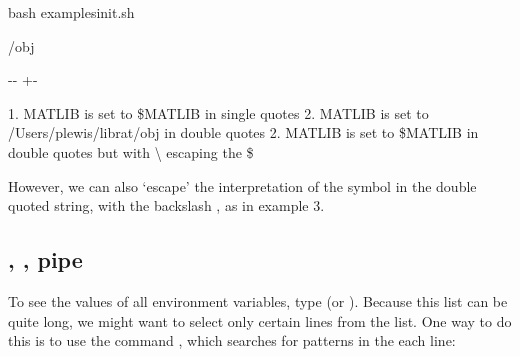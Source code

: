 \documentclass[letterpaper,10pt,english]{sphinxmanual}
\newlength\nbsphinxcodecellspacing
\begin{document}
{
\begin{sphinxVerbatim}[commandchars=\\\{\}]
\llap{\color{nbsphinxin}[3]:\,\hspace{\fboxrule}\hspace{\fboxsep}}\PYGZpc{}\PYGZpc{}bash
 examples\PYGZus{}init.sh

 /obj

 
 
 
\end{sphinxVerbatim}
}

{

\kern-\sphinxverbatimsmallskipamount\kern-\baselineskip
\kern+\FrameHeightAdjust\kern-\fboxrule
\vspace{\nbsphinxcodecellspacing}

\begin{sphinxVerbatim}[commandchars=\\\{\}]
1. MATLIB is set to \$MATLIB in single quotes
2. MATLIB is set to /Users/plewis/librat/obj in double quotes
2. MATLIB is set to \$MATLIB in double quotes but with \textbackslash{} escaping the \$
\end{sphinxVerbatim}
}

However, we can also ‘escape’ the interpretation of the \sphinxcode{\sphinxupquote{\$}} symbol in the double quoted string, with the backslash  \sphinxcode{\sphinxupquote{\textbackslash{}}}, as in example 3.


\subsection{, , pipe \sphinxstyleliteralintitle{\sphinxupquote{|}}}
\label{\detokenize{Appendix1:env,-grep,-pipe-|}}
To see the values of all environment variables, type  (or ). Because this list can be quite long, we might want to select only certain lines from the list. One way to do this is to use the command , which searches for patterns in the each line:
\end{document}
